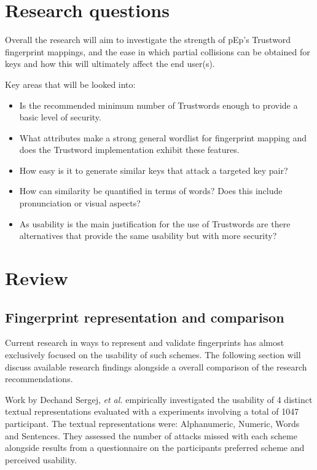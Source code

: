 \section{Research questions}

Overall the research will aim to investigate the strength of pEp's Trustword fingerprint mappings, and the ease in which partial collisions can be obtained for keys and how this will ultimately affect the end user(s).

Key areas that will be looked into:
\begin{itemize}
    \item Is the recommended minimum number of Trustwords enough to provide a basic level of security.
    \item What attributes make a strong general wordlist for fingerprint mapping and does the Trustword implementation exhibit these features.
    \item How easy is it to generate similar keys that attack a targeted key pair?
    \item How can similarity be quantified in terms of words? Does this include pronunciation or visual aspects?
    \item As usability is the main justification for the use of Trustwords are there alternatives that provide the same usability but with more security?
\end{itemize}

\section{Review}

\subsection{Fingerprint representation and comparison}

Current research in ways to represent and validate fingerprints has almost exclusively focused on the usability of such schemes. The following section will discuss available research findings alongside a overall comparison of the research recommendations.

Work by Dechand Sergej, \textit{et al.}\cite{dechand2016empirical} empirically investigated the usability of 4 distinct textual representations evaluated with a experiments involving a total of 1047 participant. The textual representations were: Alphanumeric, Numeric, Words and Sentences. They assessed the number of attacks missed with each scheme alongside results from a questionnaire on the participants preferred scheme and perceived usability.

